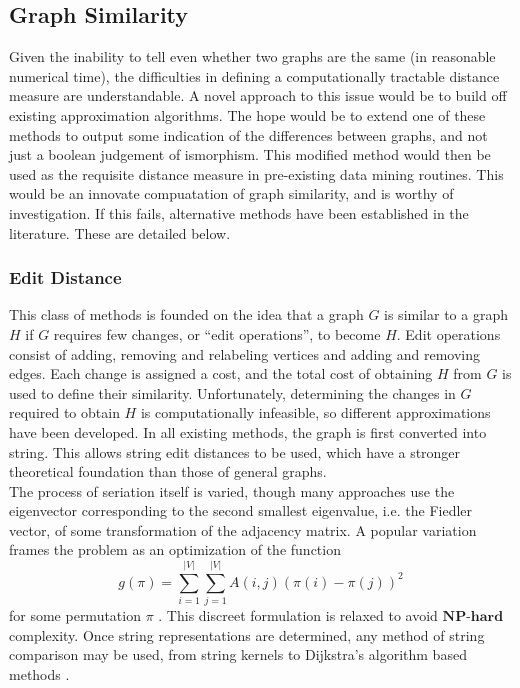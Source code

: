 \documentclass[11pt]{article}
\begin{document}
\subsection{Graph Similarity}
\indent Given the inability to tell even whether two graphs are the same (in reasonable numerical time), the difficulties in defining a computationally tractable distance measure are understandable. A novel approach to this issue would be to build off existing approximation algorithms. The hope would be to extend one of these methods to output some indication of the differences between graphs, and not just a boolean judgement of ismorphism. This modified method would then be used as the requisite distance measure in pre-existing data mining routines. This would be an innovate compuatation of graph similarity, and is worthy of investigation. If this fails, alternative methods have been established in the literature. These are detailed below.
\subsubsection{Edit Distance}
\indent This class of methods is founded on the idea that a graph $G$ is similar to a graph $H$ if $G$ requires few changes, or ``edit operations'', to become $H$. Edit operations consist of adding, removing and relabeling vertices and adding and removing edges. Each change is assigned a cost, and the total cost of obtaining $H$ from $G$ is used to define their similarity. Unfortunately, determining the changes in $G$ required to obtain $H$ is computationally infeasible, so different approximations have been developed. In all existing methods, the graph is first converted into string. This allows string edit distances to be used, which have a stronger theoretical foundation than those of general graphs. \vspace{1mm}\\
\indent The process of seriation itself is varied, though many approaches use the eigenvector corresponding to the second smallest eigenvalue, i.e. the Fiedler vector, of some transformation of the adjacency matrix. A popular variation frames the problem as an optimization of the function
\[
g(\pi) = \sum \limits_{i=1}^{|V|} \sum \limits_{j=1}^{|V|} A(i,j)(\pi(i) - \pi(j))^2
\]
for some permutation $\pi$ \cite{AtkinsEtAl}. This discreet formulation is relaxed to avoid $\textbf{NP-hard}$ complexity. Once string representations are determined, any method of string comparison may be used, from string kernels to Dijkstra's algorithm based methods \cite{hangyu} \cite{RoblesKelly2004}. 
\end{document}
